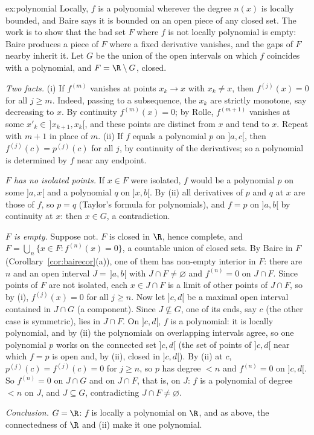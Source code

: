 \begin{solution}{ex:polynomial}
\idea Locally, $f$ is a polynomial wherever the degree $n(x)$ is locally bounded, and Baire says it is bounded on an open piece of any closed set. The
work is to show that the bad set $F$ where $f$ is not locally polynomial is empty: Baire produces a piece of $F$ where a fixed derivative vanishes, and
the gaps of $F$ nearby inherit it.
\writeup Let $G$ be the union of the open intervals on which $f$ coincides with a polynomial, and $F=\R\setminus G$, closed.

\emph{Two facts.} (i) If $f^{(m)}$ vanishes at points $x_k\to x$ with $x_k\ne x$, then $f^{(j)}(x)=0$ for all $j\ge m$. Indeed, passing to a subsequence, the $x_k$ are strictly monotone, say decreasing to $x$. By
continuity $f^{(m)}(x)=0$; by Rolle, $f^{(m+1)}$ vanishes at some $x'_k\in\,]x_{k+1},x_k[$, and these points are distinct from $x$ and tend to $x$. Repeat with $m+1$ in place of $m$. (ii) If $f$ equals a polynomial $p$ on $]a,c[$, then
$f^{(j)}(c)=p^{(j)}(c)$ for all $j$, by continuity of the derivatives; so a polynomial is determined by $f$ near any endpoint.

\emph{$F$ has no isolated points.} If $x\in F$ were isolated, $f$ would be a polynomial $p$ on some $]a,x[$ and a polynomial $q$ on $]x,b[$. By (ii) all derivatives of $p$ and $q$ at $x$
are those of $f$, so $p=q$ (Taylor's formula for polynomials), and $f=p$ on $]a,b[$ by continuity at $x$: then $x\in G$, a contradiction.

\emph{$F$ is empty.} Suppose not. $F$ is closed in $\R$, hence complete, and $F=\bigcup_n\{x\in F:f^{(n)}(x)=0\}$, a countable union of closed sets. By Baire in $F$ (Corollary~\ref{cor:bairecor}(a)),
one of them has non-empty interior in $F$: there are $n$ and an open interval $J=\,]a,b[$ with $J\cap F\ne\varnothing$ and $f^{(n)}=0$ on $J\cap F$. Since points of $F$ are not isolated, each $x\in J\cap F$ is a
limit of other points of $J\cap F$, so by (i), $f^{(j)}(x)=0$ for all $j\ge n$. Now let $]c,d[$ be a maximal open interval contained in $J\cap G$ (a component). Since $J\not\subseteq G$, one of its ends,
say $c$ (the other case is symmetric), lies in $J\cap F$. On $]c,d[$, $f$ is a polynomial: it is locally polynomial, and by (ii) the polynomials on overlapping intervals agree, so one polynomial $p$ works on the
connected set $]c,d[$ (the set of points of $]c,d[$ near which $f=p$ is open and, by (ii), closed in $]c,d[$). By (ii) at $c$, $p^{(j)}(c)=f^{(j)}(c)=0$ for $j\ge n$, so $p$ has degree $<n$ and $f^{(n)}=0$ on
$]c,d[$. So $f^{(n)}=0$ on $J\cap G$ and on $J\cap F$, that is, on $J$: $f$ is a polynomial of degree $<n$ on $J$, and $J\subseteq G$, contradicting $J\cap F\ne\varnothing$.

\emph{Conclusion.} $G=\R$: $f$ is locally a polynomial on $\R$, and as above, the connectedness of $\R$ and (ii) make it one polynomial.
\end{solution}

